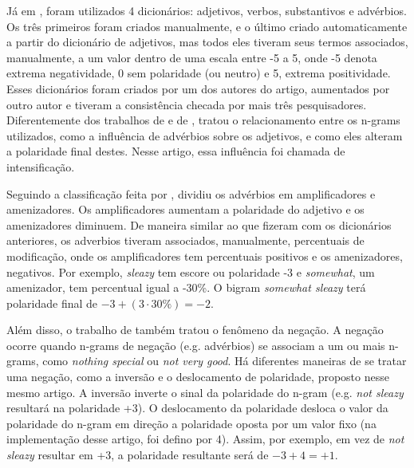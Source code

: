 \documentclass[template.tex]{subfiles}
\begin{document}
Já em \cite{taboada2008extracting}, foram utilizados 4 dicionários: adjetivos, verbos, substantivos e advérbios. Os três primeiros foram criados manualmente, e o último criado automaticamente a partir do dicionário de adjetivos, mas todos eles tiveram seus termos associados, manualmente, a um valor dentro de uma escala entre -5 a 5, onde -5 denota extrema negatividade, 0 sem polaridade (ou neutro) e 5, extrema positividade. Esses dicionários foram criados por um dos autores do artigo, aumentados por outro autor e tiveram a consistência checada por mais três pesquisadores. Diferentemente dos trabalhos de \cite{turney2002thumbs} e de \cite{tsutsumi2007movie}, \cite{taboada2008extracting} tratou o relacionamento entre os n-grams utilizados, como a influência de advérbios sobre os adjetivos, e como eles alteram a polaridade final destes. Nesse artigo, essa influência foi chamada de intensificação.

Seguindo a classificação feita por \cite{quirk1985comprehensive}, \cite{taboada2008extracting} dividiu os advérbios em amplificadores e amenizadores. Os amplificadores aumentam a polaridade do adjetivo e os amenizadores diminuem. De maneira similar ao que fizeram com os dicionários anteriores, os adverbios tiveram associados, manualmente, percentuais de modificação, onde os amplificadores tem percentuais positivos e os amenizadores, negativos. Por exemplo, \textit{sleazy} tem escore ou polaridade -3 e \textit{somewhat}, um amenizador, tem percentual igual a -30\%. O bigram \textit{somewhat sleazy} terá polaridade final de $-3 + (3 \cdot 30\%) = -2$.

Além disso, o trabalho de \cite{taboada2008extracting} também tratou o fenômeno da negação. A negação ocorre quando n-grams de negação (e.g. advérbios) se associam a um ou mais n-grams, como \textit{nothing special} ou \textit{not very good}. Há diferentes maneiras de se tratar uma negação, como a inversão e o deslocamento de polaridade, proposto nesse mesmo artigo. A inversão inverte o sinal da polaridade do n-gram (e.g. \textit{not sleazy} resultará na polaridade +3). O deslocamento da polaridade 	desloca o valor da polaridade do n-gram em direção a polaridade oposta por um valor fixo (na implementação desse artigo, foi defino por 4). Assim, por exemplo, em vez de \textit{not sleazy} resultar em +3, a polaridade resultante será de $-3 + 4 = +1$.
\end{document}
